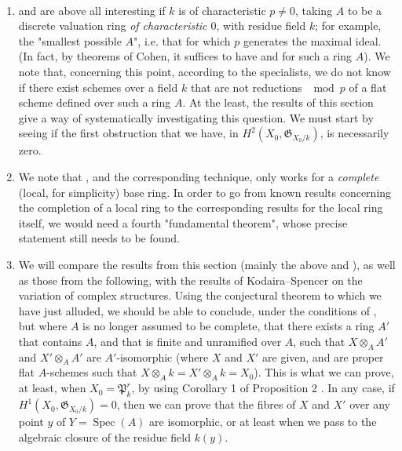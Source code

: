 \begin{remark}\label{fga2-6-remarks}~
    \begin{enumerate}
        \item {} and  are above all interesting if $k$ is of characteristic $p\neq0$, taking $A$ to be a discrete valuation ring \emph{of characteristic $0$}, with residue field $k$;
              for example, the "smallest possible $A$", i.e. that for which $p$ generates the maximal ideal.
              (In fact, by theorems of Cohen, it suffices to have  and  for such a ring $A$).
              We note that, concerning this point, according to the specialists, we do not know if there exist schemes over a field $k$ that are not reductions $\mod p$ of a flat scheme defined over such a ring $A$.
              At the least, the results of this section give a way of systematically investigating this question.
              We must start by seeing if the first obstruction that we have, in $H^2(X_0,\mathfrak{G}_{X_0/k})$, is necessarily zero.
        \item We note that , and the corresponding technique, only works for a \emph{complete} (local, for simplicity) base ring.
              In order to go from known results concerning the completion of a local ring to the corresponding results for the local ring itself, we would need a fourth "fundamental theorem", whose precise statement still needs to be found.
        \item We will compare the results from this section (mainly the above  and ), as well as those from the following, with the results of Kodaira–Spencer on the variation of complex structures.
              Using the conjectural theorem to which we have just alluded, we should be able to conclude, under the conditions of , but where $A$ is no longer assumed to be complete, that there exists a ring $A'$ that contains $A$, and that is finite and unramified over $A$, such that $X\otimes_AA'$ and $X'\otimes_AA'$ are $A'$-isomorphic (where $X$ and $X'$ are given, and are proper flat $A$-schemes such that $X\otimes_Ak=X'\otimes_Ak=X_0$).
              This is what we can prove, at least, when $X_0=\mathfrak{P}_k^r$, by using Corollary 1 of Proposition 2 .
              In any case, if $H^1(X_0,\mathfrak{G}_{X_0/k})=0$, then we can prove that the fibres of $X$ and $X'$ over any point $y$ of $Y=\operatorname{Spec}(A)$ are isomorphic, or at least when we pass to the algebraic closure of the residue field $k(y)$.

\end{enumerate}
\end{remark}
